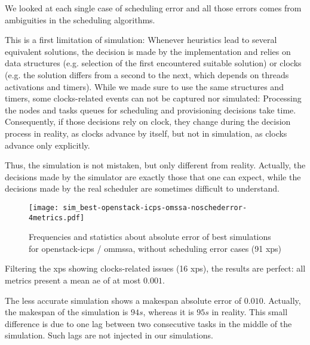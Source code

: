 {\begin{itemize}
      We looked at each single case of scheduling error and all those errors 
      comes from ambiguities in the scheduling algorithms.
      
      This is a first limitation of simulation:
      Whenever heuristics lead to several equivalent solutions, 
      the decision is made by the implementation and relies on data structures 
      (e.g. selection of the first encountered suitable solution) or clocks 
      (e.g. the solution differs from a second to the next, which depends 
      on threads activations and timers). While we made sure to use the same 
      structures and timers, some clocks-related events can not be captured nor 
      simulated: Processing the nodes and tasks queues for scheduling and 
      provisioning decisions take time. Consequently, if those decisions rely on
      clock, they change during the decision process in reality, as clocks advance 
      by itself, but not in simulation, as clocks advance only explicitly.
      
      Thus, the simulation is not mistaken, but only different from reality.
      Actually, the decisions made by the simulator are exactly those that one 
      can expect, while the decisions made by the real scheduler are sometimes
      difficult to understand.

      
\begin{figure}  
  \texttt{[image: sim\_best-openstack-icps-omssa-noschederror-4metrics.pdf]}

  
      
  

\caption{Frequencies and statistics about absolute error of best simulations for openstack-icps / 
ommssa, without scheduling error cases (91 xps)}
\end{figure}       

      Filtering the xps showing clocks-related issues (16 xps), the results are perfect:
      all metrics present a mean ae of at most $0.001$.
      
      The less accurate simulation shows a makespan absolute error of $0.010$. 
      Actually, the makespan of the simulation is $94s$, whereas it is $95s$ in reality.
      This small difference is due to one lag between two consecutive tasks 
      in the middle of the simulation. Such lags are not injected in our simulations.
      

\end{itemize}}
